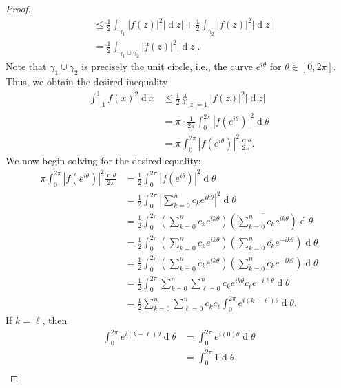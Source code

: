 \documentclass[12pt]{article}
\newcommand{\<}{\left\langle} %
\renewcommand{\>}{\right\rangle} %
\renewcommand{\d}[1]{\operatorname{d}\!#1} %
\let\conj\overline %
\begin{document}
\begin{proof}
\begin{align*}
            &\leq \frac12 \int_{\gamma_1} |f(z)|^2 |\d{z}|  + \frac12  \int_{\gamma_2} |f(z)|^2 |\d{z}| \\[1em] 
            &= \frac12 \int_{\gamma_1 \cup \gamma_2} |f(z)|^2 |\d{z}|.
    \end{align*}
    Note that $\gamma_1 \cup \gamma_2$ is precisely the unit circle, i.e., the curve $e^{i\theta}$ for $\theta \in [0, 2\pi]$. Thus, we obtain the desired inequality
    \begin{align*}
        \int_{-1}^1 f(x)^2 \d{x}
            &\leq \frac12 \oint_{|z| = 1} |f(z)|^2 |\d{z}| \\[1em]
            &= \pi \cdot \frac1{2\pi} \int_0^{2\pi} |f(e^{i\theta})|^2 \d{\theta} \\[1em]
            &= \pi \int_0^{2\pi} |f(e^{i\theta})|^2 \frac{\d{\theta}}{2\pi}.
    \end{align*}
    We now begin solving for the desired equality:
    \allowdisplaybreaks
    \begin{align*}
        \pi \int_0^{2\pi} |f(e^{i\theta})|^2 \frac{\d{\theta}}{2\pi}
            &= \frac12 \int_0^{2\pi} |f(e^{i\theta})|^2 \d{\theta} \\[1em]
            &= \frac12 \int_0^{2\pi} \left| \sum_{k=0}^n c_k e^{ik\theta} \right|^2 \d{\theta} \\[1em]
            &= \frac12 \int_0^{2\pi} \left( \sum_{k=0}^n c_k e^{ik\theta} \right) \left(\conj{ \sum_{k=0}^n c_k e^{ik\theta} }\right) \d{\theta} \\[1em]
            &= \frac12 \int_0^{2\pi} \left( \sum_{k=0}^n c_k e^{ik\theta} \right) \left(\sum_{k=0}^n \conj{c_k} e^{-ik\theta} \right) \d{\theta} \\[1em]
            &= \frac12 \int_0^{2\pi} \left( \sum_{k=0}^n c_k e^{ik\theta} \right) \left(\sum_{k=0}^n c_k e^{-ik\theta} \right) \d{\theta} \\[1em]
            &= \frac12 \int_0^{2\pi} \sum_{k=0}^n \sum_{\ell=0}^n c_k e^{ik\theta} c_\ell e^{-i\ell\theta} \d{\theta} \\[1em]
            &= \frac12 \sum_{k=0}^n \sum_{\ell=0}^n c_kc_\ell \int_0^{2\pi} e^{i(k - \ell)\theta} \d{\theta}.
    \end{align*}
    If $k = \ell$, then
    \begin{align*}
        \int_0^{2\pi} e^{i(k - \ell)\theta} \d{\theta}
            &= \int_0^{2\pi} e^{i(0)\theta} \d{\theta} \\[1em]
            &= \int_0^{2\pi} 1 \d{\theta} \\[1em]

\end{align*}
\end{proof}
\end{document}
